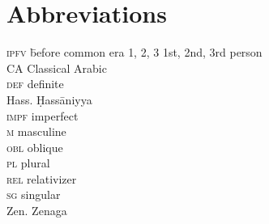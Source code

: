 \documentclass[output=paper]{langsci/langscibook}
\begin{document}
\section*{Abbreviations}
\begin{multicols}{2}
\begin{tabbing}
\textsc{ipfv} \hspace{1em} \= before common era\kill
\textsc{1, 2, 3} \> 1st, 2nd, 3rd person \\
CA           \> Classical Arabic \\
\textsc{def}     \> {definite} \\
Hass.           \> Ḥassāniyya \\
\textsc{impf}   \> imperfect \\
\textsc{m}   \> masculine\\
\textsc{obl} \> oblique \\
\textsc{pl}  \> plural\\
\textsc{rel}     \> {relativizer}\\
\textsc{sg}  \> singular \\
Zen. \> Zenaga
\end{tabbing}
\end{multicols}



\sloppy
\printbibliography[heading=subbibliography,notkeyword=this]
\end{document}
